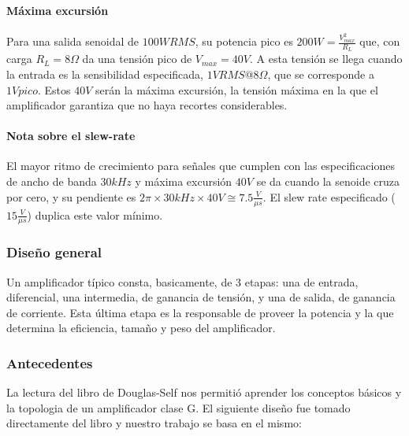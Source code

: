 \documentclass[a4paper,12pt,twoside]{article}
\begin{document}
\paragraph{Máxima excursión} Para una salida senoidal de $100W RMS$, su potencia pico es $200W = \frac{V_{max}^2}{R_L}$ que, con carga $R_L=8\Omega$ da una tensión pico de $V_{max}=40V$. A esta tensión se llega cuando la entrada es la sensibilidad especificada, $1V RMS @8\Omega$, que se corresponde a $1V pico$. Estos $40V$ serán la máxima excursión, la tensión máxima en la que el amplificador garantiza que no haya recortes considerables.

\paragraph{Nota sobre el slew-rate} El mayor ritmo de crecimiento para señales que cumplen con las especificaciones de ancho de banda $30kHz$ y máxima excursión $40V$ se da cuando la senoide cruza por cero, y su pendiente es $2 \pi \times 30kHz\times 40V\cong 7.5\frac{V}{\mu s}$. El slew rate especificado ($15\frac{V}{\mu s}$) duplica este valor mínimo.


\subsubsection{Diseño general}

Un amplificador típico consta, basicamente, de 3 etapas: una de entrada, diferencial,  una intermedia, de ganancia de tensión, y una de salida, de ganancia de corriente. Esta última etapa es la responsable de proveer la potencia y la que determina la eficiencia, tamaño y peso del amplificador.

\subsubsection{Antecedentes}
La lectura del libro de Douglas-Self nos permitió  aprender los conceptos básicos y la topologia de un amplificador clase G. El siguiente diseño fue tomado directamente del libro y nuestro trabajo se basa en el mismo:
\end{document}

